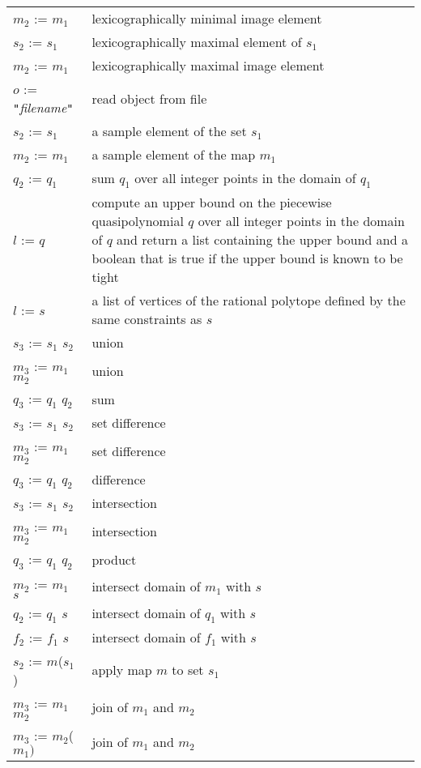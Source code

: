 \begin{supertabular}{lp{0.7\textwidth}}
$m_2$ :=  $m_1$ &
lexicographically minimal image element
\\
$s_2$ :=  $s_1$ &
lexicographically maximal element of $s_1$
\\
$m_2$ :=  $m_1$ &
lexicographically maximal image element
\\
$o$ :=  {\tt "}{\it filename}{\tt"} &
read object from file
\\
$s_2$ :=  $s_1$ &
a sample element of the set $s_1$
\\
$m_2$ :=  $m_1$ &
a sample element of the map $m_1$
\\
$q_2$ :=  $q_1$ &
sum $q_1$ over all integer points in the domain of $q_1$
\\
$l$ :=  $q$ &
compute an
upper bound on the piecewise quasipolynomial $q$ over
all integer points in the domain of $q$
and return a list containing the upper bound
and a boolean that is true if the upper bound
is known to be tight
\\
$l$ :=  $s$ &
a list of vertices of the rational polytope defined by the same constraints
as $s$
\\
$s_3$ := $s_1$ \ai{$+$} $s_2$ & union
\\
$m_3$ := $m_1$ \ai{$+$} $m_2$ & union
\\
$q_3$ := $q_1$ \ai{$+$} $q_2$ & sum
\\
$s_3$ := $s_1$ \ai{$-$} $s_2$ & set difference
\\
$m_3$ := $m_1$ \ai{$-$} $m_2$ & set difference
\\
$q_3$ := $q_1$ \ai{$-$} $q_2$ & difference
\\
$s_3$ := $s_1$ \ai{$*$} $s_2$ & intersection
\\
$m_3$ := $m_1$ \ai{$*$} $m_2$ & intersection
\\
$q_3$ := $q_1$ \ai{$*$} $q_2$ & product
\\
$m_2$ := $m_1$ \ai{$*$} $s$ & intersect domain of $m_1$ with $s$
\\
$q_2$ := $q_1$ \ai{$*$} $s$ & intersect domain of $q_1$ with $s$
\\
$f_2$ := $f_1$ \ai{$*$} $s$ & intersect domain of $f_1$ with $s$
\\
$s_2$ := $m$($s_1$) & apply map $m$ to set $s_1$
\\
$m_3$ := $m_1$  $m_2$ & join of $m_1$ and $m_2$
\\
$m_3$ := $m_2$($m_1)$ & join of $m_1$ and $m_2$

\end{supertabular}
